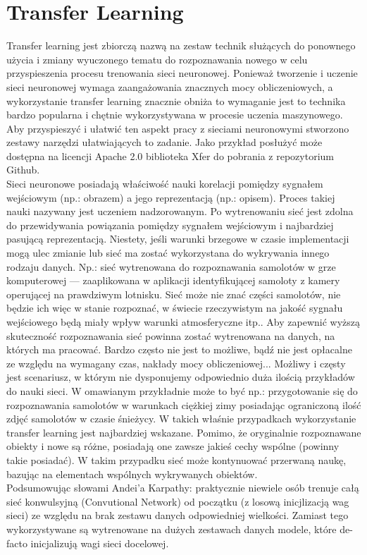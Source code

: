 \section{Transfer Learning}

Transfer learning jest zbiorczą nazwą na zestaw technik służących do ponownego użycia i zmiany wyuczonego tematu do rozpoznawania nowego w celu przyspieszenia procesu trenowania sieci neuronowej. Ponieważ tworzenie i uczenie sieci neuronowej wymaga zaangażowania znacznych mocy obliczeniowych, a wykorzystanie transfer learning znacznie obniża to wymaganie jest to technika bardzo popularna i chętnie wykorzystywana w procesie uczenia maszynowego. Aby przyspieszyć i ułatwić ten aspekt pracy z sieciami neuronowymi stworzono zestawy narzędzi ułatwiających to zadanie. Jako przykład posłużyć może dostępna na licencji Apache 2.0 biblioteka Xfer do pobrania z repozytorium Github\cite{xfer_git}.\\

Sieci neuronowe posiadają właściwość nauki korelacji pomiędzy sygnałem wejściowym (np.: obrazem) a jego reprezentacją (np.: opisem). Proces takiej nauki nazywany jest uczeniem nadzorowanym. Po wytrenowaniu sieć jest zdolna do przewidywania powiązania pomiędzy sygnałem wejściowym i najbardziej pasującą reprezentacją. Niestety, jeśli warunki brzegowe w czasie implementacji mogą ulec zmianie lub sieć ma zostać wykorzystana do wykrywania innego rodzaju danych. Np.: sieć wytrenowana do rozpoznawania samolotów w grze komputerowej --- zaaplikowana w aplikacji identyfikującej samoloty z kamery operującej na prawdziwym lotnisku. Sieć może nie znać części samolotów, nie będzie ich więc w stanie rozpoznać, w świecie rzeczywistym na jakość sygnału wejściowego będą miały wpływ warunki atmosferyczne itp..
Aby zapewnić wyższą skuteczność rozpoznawania sieć powinna zostać wytrenowana na danych, na których ma pracować. Bardzo często nie jest to możliwe, bądź nie jest opłacalne ze względu na wymagany czas, nakłady mocy obliczeniowej... Możliwy i częsty jest scenariusz, w którym nie dysponujemy odpowiednio duża ilością przykładów do nauki sieci. W omawianym przykładnie może to być np.: przygotowanie się do rozpoznawania samolotów w warunkach ciężkiej zimy posiadając ograniczoną ilość zdjęć samolotów w czasie śnieżycy. W takich właśnie przypadkach wykorzystanie transfer learning jest najbardziej wskazane. Pomimo, że oryginalnie rozpoznawane obiekty i nowe są różne, posiadają one zawsze jakieś cechy wspólne (powinny takie posiadać). W takim przypadku sieć może kontynuować przerwaną naukę, bazując na elementach wspólnych wykrywanych obiektów.\\

Podsumowując słowami Andei'a Karpathy\cite{karpathy:CS231}: praktycznie niewiele osób trenuje całą sieć konwulsyjną (Convutional Network) od początku (z losową inicjlizacją wag sieci) ze względu na brak zestawu danych odpowiedniej wielkości. Zamiast tego wykorzystywane są wytrenowane na dużych zestawach danych modele, które de-facto inicjalizują wagi sieci docelowej.




